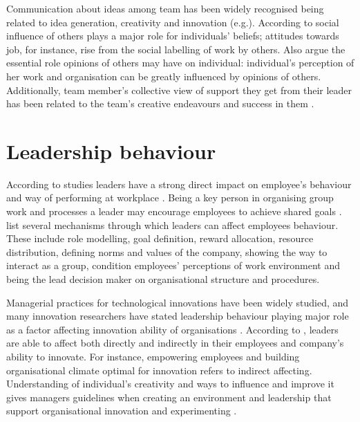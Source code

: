 Communication about ideas among team has been widely recognised being related to idea generation, creativity and innovation (e.g.\citep{robinson1997corporate,mumford2002social,monge1992communication,amabile1996assessing}). According to \citet{staw1989tradeoff} social influence of others plays a major role for individuals' beliefs; attitudes towards job, for instance, rise from the social labelling of work by others.  Also \citet{salancik1978social} argue the essential role opinions of others may have on individual: individual's perception of her work and organisation can be greatly influenced by opinions of others. Additionally, team member's collective view of support they get from their leader has been related to the team's creative endeavours and success in them \citep{amabile1998kill,amabile1996assessing}. 
  


\section{Leadership behaviour}
According to studies leaders have a strong direct impact on employee's behaviour and way of performing at workplace \citep{katz1978social,redmond1993putting}. Being a key person in organising group work and processes a leader may encourage employees to achieve shared goals \citep{amabile1998kill}. \citet{avolio1988transformational} list several mechanisms through which leaders can affect employees behaviour. These include role modelling, goal definition, reward allocation, resource distribution, defining norms and values of the company, showing the way to interact as a group, condition employees' perceptions of work environment and being the lead decision maker on organisational structure and procedures.

Managerial practices for technological innovations have been widely studied, and many innovation researchers have stated leadership behaviour playing major role as a factor affecting innovation ability of organisations \citep{buijs2007innovation,jung2003role,jung2001transformational,amabile1998kill,mumford1988creativity}. According to \citet{jung2003role}, leaders are able to affect both directly and indirectly in their employees and company's ability to innovate. For instance, empowering employees and building organisational climate optimal for innovation refers to indirect affecting. Understanding of individual's creativity and ways to influence and improve it gives managers guidelines when creating an environment and leadership that support organisational innovation and experimenting \citep{redmond1993putting}. 

